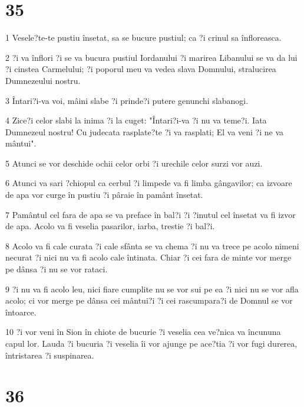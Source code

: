 \chapter{35}

\par 1 Vesele?te-te pustiu însetat, sa se bucure pustiul; ca ?i crinul sa înfloreasca.
\par 2 ?i va înflori ?i se va bucura pustiul Iordanului ?i marirea Libanului se va da lui ?i cinstea Carmelului; ?i poporul meu va vedea slava Domnului, stralucirea Dumnezeului nostru.
\par 3 Întari?i-va voi, mâini slabe ?i prinde?i putere genunchi slabanogi.
\par 4 Zice?i celor slabi la inima ?i la cuget: "Întari?i-va ?i nu va teme?i. Iata Dumnezeul nostru! Cu judecata rasplate?te ?i va rasplati; El va veni ?i ne va mântui".
\par 5 Atunci se vor deschide ochii celor orbi ?i urechile celor surzi vor auzi.
\par 6 Atunci va sari ?chiopul ca cerbul ?i limpede va fi limba gângavilor; ca izvoare de apa vor curge în pustiu ?i pâraie în pamânt însetat.
\par 7 Pamântul cel fara de apa se va preface în bal?i ?i ?inutul cel însetat va fi izvor de apa. Acolo va fi veselia pasarilor, iarba, trestie ?i bal?i.
\par 8 Acolo va fi cale curata ?i cale sfânta se va chema ?i nu va trece pe acolo nimeni necurat ?i nici nu va fi acolo cale întinata. Chiar ?i cei fara de minte vor merge pe dânsa ?i nu se vor rataci.
\par 9 ?i nu va fi acolo leu, nici fiare cumplite nu se vor sui pe ea ?i nici nu se vor afla acolo; ci vor merge pe dânsa cei mântui?i ?i cei rascumpara?i de Domnul se vor întoarce.
\par 10 ?i vor veni în Sion în chiote de bucurie ?i veselia cea ve?nica va încununa capul lor. Lauda ?i bucuria ?i veselia îi vor ajunge pe ace?tia ?i vor fugi durerea, întristarea ?i suspinarea.

\chapter{36}

